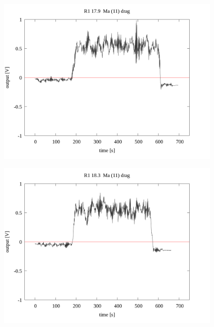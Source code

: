 \documentclass[a4paper]{jsarticle}
\begin{document}
\begin{figure}[htbp]
    \footnotesize
    \begin{center}
        \includegraphics[width=140mm]{../../../33_result/210806/moving_average/11/drag/R1_17.9_ma(11)_drag.png}
    \end{center}
\end{figure}

\begin{figure}[htbp]
    \footnotesize
    \begin{center}
        \includegraphics[width=140mm]{../../../33_result/210806/moving_average/11/drag/R1_18.6_ma(11)_drag.png}
    \end{center}
\end{figure}
\end{document}
